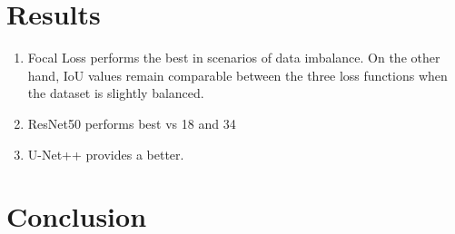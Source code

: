 \documentclass[sigconf, nonacm]{acmart}
\begin{document}
\section{Results}
\begin{enumerate}
    \item Focal Loss performs the best in scenarios of data imbalance. On the other hand, IoU values remain comparable between the three loss functions when the dataset is slightly balanced.
    \item ResNet50 performs best vs 18 and 34
    \item U-Net++ provides a better.
\end{enumerate}
\section{Conclusion}





\end{document}
